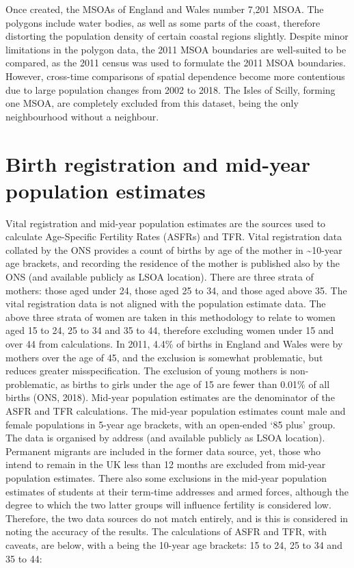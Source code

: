 \documentclass[12pt,twoside]{reedthesis}
\begin{document}
Once created, the MSOAs of England and Wales number 7,201 MSOA. The polygons include water bodies, as well as some parts of the coast, therefore distorting the population density of certain coastal regions slightly. Despite minor limitations in the polygon data, the 2011 MSOA boundaries are well-suited to be compared, as the 2011 census was used to formulate the 2011 MSOA boundaries. However, cross-time comparisons of spatial dependence become more contentious due to large population changes from 2002 to 2018. The Isles of Scilly, forming one MSOA, are completely excluded from this dataset, being the only neighbourhood without a neighbour.

\hypertarget{birth-registration-and-mid-year-population-estimates}{%
\section{Birth registration and mid-year population estimates}\label{birth-registration-and-mid-year-population-estimates}}

Vital registration and mid-year population estimates are the sources used to calculate Age-Specific Fertility Rates (ASFRs) and TFR. Vital registration data collated by the ONS provides a count of births by age of the mother in \textasciitilde10-year age brackets, and recording the residence of the mother is published also by the ONS (and available publicly as LSOA location). There are three strata of mothers: those aged under 24, those aged 25 to 34, and those aged above 35. The vital registration data is not aligned with the population estimate data. The above three strata of women are taken in this methodology to relate to women aged 15 to 24, 25 to 34 and 35 to 44, therefore excluding women under 15 and over 44 from calculations. In 2011, 4.4\% of births in England and Wales were by mothers over the age of 45, and the exclusion is somewhat problematic, but reduces greater misspecification. The exclusion of young mothers is non-problematic, as births to girls under the age of 15 are fewer than 0.01\% of all births (ONS, 2018). Mid-year population estimates are the denominator of the ASFR and TFR calculations. The mid-year population estimates count male and female populations in 5-year age brackets, with an open-ended `85 plus' group. The data is organised by address (and available publicly as LSOA location). Permanent migrants are included in the former data source, yet, those who intend to remain in the UK less than 12 months are excluded from mid-year population estimates. There also some exclusions in the mid-year population estimates of students at their term-time addresses and armed forces, although the degree to which the two latter groups will influence fertility is considered low. Therefore, the two data sources do not match entirely, and is this is considered in noting the accuracy of the results. The calculations of ASFR and TFR, with caveats, are below, with a being the 10-year age brackets: 15 to 24, 25 to 34 and 35 to 44:
\end{document}
